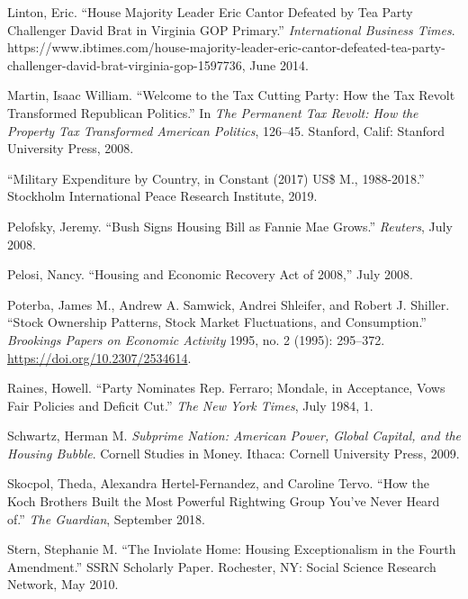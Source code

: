 \documentclass[
]{article}
\begin{document}
\leavevmode\hypertarget{ref-linton2014house}{}%
Linton, Eric. ``House Majority Leader Eric Cantor Defeated by Tea Party
Challenger David Brat in Virginia GOP Primary.'' \emph{International
Business Times}.
https://www.ibtimes.com/house-majority-leader-eric-cantor-defeated-tea-party-challenger-david-brat-virginia-gop-1597736,
June 2014.

\leavevmode\hypertarget{ref-martin2008welcome}{}%
Martin, Isaac William. ``Welcome to the Tax Cutting Party: How the Tax
Revolt Transformed Republican Politics.'' In \emph{The Permanent Tax
Revolt: How the Property Tax Transformed American Politics}, 126--45.
Stanford, Calif: Stanford University Press, 2008.

\leavevmode\hypertarget{ref-2019military}{}%
``Military Expenditure by Country, in Constant (2017) US\$ M.,
1988-2018.'' Stockholm International Peace Research Institute, 2019.

\leavevmode\hypertarget{ref-pelofsky2008bush}{}%
Pelofsky, Jeremy. ``Bush Signs Housing Bill as Fannie Mae Grows.''
\emph{Reuters}, July 2008.

\leavevmode\hypertarget{ref-pelosi2008housing}{}%
Pelosi, Nancy. ``Housing and Economic Recovery Act of 2008,'' July 2008.

\leavevmode\hypertarget{ref-poterba1995stock}{}%
Poterba, James M., Andrew A. Samwick, Andrei Shleifer, and Robert J.
Shiller. ``Stock Ownership Patterns, Stock Market Fluctuations, and
Consumption.'' \emph{Brookings Papers on Economic Activity} 1995, no. 2
(1995): 295--372. \url{https://doi.org/10.2307/2534614}.

\leavevmode\hypertarget{ref-raines1984party}{}%
Raines, Howell. ``Party Nominates Rep. Ferraro; Mondale, in Acceptance,
Vows Fair Policies and Deficit Cut.'' \emph{The New York Times}, July
1984, 1.

\leavevmode\hypertarget{ref-schwartz2009subprime}{}%
Schwartz, Herman M. \emph{Subprime Nation: American Power, Global
Capital, and the Housing Bubble}. Cornell Studies in Money. Ithaca:
Cornell University Press, 2009.

\leavevmode\hypertarget{ref-skocpol2018how}{}%
Skocpol, Theda, Alexandra Hertel-Fernandez, and Caroline Tervo. ``How
the Koch Brothers Built the Most Powerful Rightwing Group You've Never
Heard of.'' \emph{The Guardian}, September 2018.

\leavevmode\hypertarget{ref-sternInviolateHomeHousing2010}{}%
Stern, Stephanie M. ``The Inviolate Home: Housing Exceptionalism in the
Fourth Amendment.'' SSRN Scholarly Paper. Rochester, NY: Social Science
Research Network, May 2010.
\end{document}
